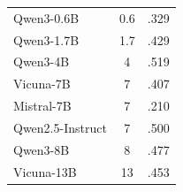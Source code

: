\begin{table}[ht]
\begin{tabular}{lcc}
Qwen3-0.6B          & 0.6 & .329 \\
Qwen3-1.7B          & 1.7 & .429 \\
Qwen3-4B            & 4   & .519 \\
Vicuna-7B           & 7   & .407 \\
Mistral-7B          & 7   & .210 \\
Qwen2.5-Instruct & 7   & .500 \\
Qwen3-8B            & 8   & .477 \\
Vicuna-13B          & 13  & .453 \\
\bottomrule
\end{tabular}
\end{table}
